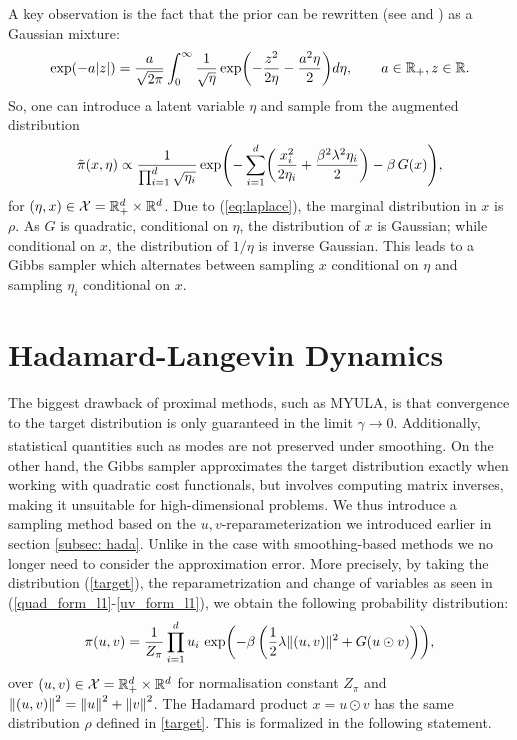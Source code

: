 \documentclass[11pt, twoside]{report}
\begin{document}

A key observation is
 the fact that the prior can be rewritten (see \cite{west1987scale} and \cite{gneiting1997normal}) as a Gaussian mixture:
\begin{equation}\label{eq:laplace}
   \exp\pa{-a\abs{z}} = \frac{a}{ \sqrt{2\pi}}\int_0^\infty \frac{1}{\sqrt{\eta}} \exp\pa{ -\frac{z^2}{2 \eta} - \frac{a^2 \eta}{2}} d\eta, \qquad a\in \real_+,z\in\real.
\end{equation}
So, one can introduce a latent variable $\eta$ and sample from the augmented distribution
\begin{equation}\label{eq:gibbs}
    \tilde \pi(x,\eta) \propto \frac{1}{\prod_{i=1}^d \sqrt{\eta_i}} \exp\Biggl( - \sum_{i=1}^d\pa{\frac{x_i^2}{2\eta_i} + \frac{\beta^2 \lambda^2 \eta_i }{2 }} - \beta \,G(x)\Biggr),
\end{equation}
for $(\eta,x)\in \mathcal X=\mathbb{R}_+^d\times \mathbb{R}^d$.
Due to (\ref{eq:laplace}), the marginal distribution in $x$ is $\rho$. As $G$ is quadratic, conditional on $\eta$,  the distribution of $x$ is  Gaussian; while conditional on $x$, the distribution of $1/\eta$ is  inverse Gaussian.
This leads to a Gibbs sampler which alternates between sampling $x$ conditional on $\eta$  and sampling $\eta_i$ conditional on $x$.
\section{Hadamard-Langevin Dynamics}
The biggest drawback of proximal methods, such as MYULA, is that convergence to the target distribution is only guaranteed in the limit $\gamma \xrightarrow[]{} 0$. Additionally, statistical quantities such as modes are not preserved under smoothing. On the other hand, the Gibbs sampler approximates the target distribution exactly when working with quadratic cost functionals, but involves computing matrix inverses, making it unsuitable for high-dimensional problems. We thus introduce a sampling method based on the $u,v$-reparameterization we introduced earlier in section \ref{subsec: hada}. Unlike in the case with smoothing-based methods we no longer need to consider the approximation error. More precisely, by taking the distribution (\ref{target}), the reparametrization and change of variables as seen in (\ref{quad_form_l1}-\ref{uv_form_l1}), we obtain the following probability distribution:
\begin{align}
\pi(u,v)=\frac{1}{Z_\pi} \prod_{i=1}^d  u_i\, \exp\pp{-\beta\, \pp{\frac12\lambda \|(u,v)\|^2+G(u\odot v)} },\label{pi}
\end{align}
over $(u,v)\in \mathcal X= \mathbb{R}_+^d\times \mathbb {R}^d$ for normalisation constant $Z_\pi$ and $\left\lVert(u,v)\right\rVert^2=\left\lVert u\right\rVert^2+\left\lVert v\right\rVert^2$. The Hadamard  product $x=u\odot v$ has the same distribution $\rho$ defined in \ref{target}. This is formalized in the following statement.
\end{document}
